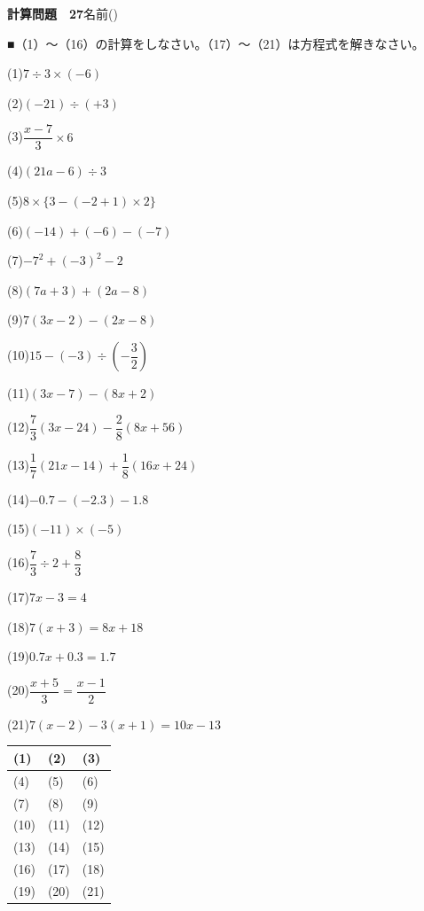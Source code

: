 \documentclass[a4paper,11pt]{ltjsarticle}
\newlength{\qcol}\setlength{\qcol}{0.47\textwidth}
\newlength{\qgap}
\newlength{\anscolw}\setlength{\anscolw}{0.30\textwidth}
\newlength{\ansh}
\newcommand{\Q}[2]{\parbox[t]{\qcol}{\raggedright (#1)\hspace{0.6em}$\displaystyle #2$}}
\newcommand{\QR}[4]{\Q{#1}{#2}\hfill\Q{#3}{#4}\par\vspace{\qgap}}
\newcommand{\anscell}[1]{\rule[-\ansdrop]{0pt}{\ansh}(#1)}
\newlength{\ansdrop}
\begin{document}
{\large\bfseries 計算問題　27}\hfill 名前(\underline{\hspace{32mm}})\par\vspace{3mm}
■（1）〜（16）の計算をしなさい。（17）〜（21）は方程式を解きなさい。\par\vspace{3mm}
\setlength{\qgap}{5.4mm}
\QR{1}{7\div3\times(-6)}{2}{(-21)\div(+3)}
\QR{3}{\dfrac{x-7}{3}\times6}{4}{(21a-6)\div3}
\QR{5}{8\times\{3-(-2+1)\times2\}}{6}{(-14)+(-6)-(-7)}
\QR{7}{-7^2+(-3)^2-2}{8}{(7a+3)+(2a-8)}
\QR{9}{7(3x-2)-(2x-8)}{10}{15-(-3)\div\left(-\dfrac{3}{2}\right)}
\QR{11}{(3x-7)-(8x+2)}{12}{\dfrac{7}{3}(3x-24)-\dfrac{2}{8}(8x+56)}
\QR{13}{\dfrac{1}{7}(21x-14)+\dfrac{1}{8}(16x+24)}{14}{-0.7-(-2.3)-1.8}
\QR{15}{(-11)\times(-5)}{16}{\dfrac{7}{3}\div2+\dfrac{8}{3}}
\QR{17}{7x-3=4}{18}{7(x+3)=8x+18}
\QR{19}{0.7x+0.3=1.7}{20}{\dfrac{x+5}{3}=\dfrac{x-1}{2}}
\vspace{1mm}
\Q{21}{7(x-2)-3(x+1)=10x-13}\par\vspace{3mm}
\setlength{\ansh}{9.5mm}\setlength{\ansdrop}{6mm}%
\begin{center}\begin{tabular}{|p{\anscolw}|p{\anscolw}|p{\anscolw}|}\hline
\anscell{1} & \anscell{2} & \anscell{3} \\\hline
\anscell{4} & \anscell{5} & \anscell{6} \\\hline
\anscell{7} & \anscell{8} & \anscell{9} \\\hline
\anscell{10} & \anscell{11} & \anscell{12} \\\hline
\anscell{13} & \anscell{14} & \anscell{15} \\\hline
\anscell{16} & \anscell{17} & \anscell{18} \\\hline
\anscell{19} & \anscell{20} & \anscell{21} \\\hline
\end{tabular}\end{center}
\end{document}
